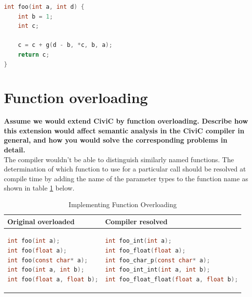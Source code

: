 \documentclass[hidelinks]{uva-inf-article}
\begin{document}
\begin{flushleft}
\begin{lstlisting}[basicstyle=\small, language=C]
int foo(int a, int d) {
	int b = 1;
	int c;

	c = c + g(d - b, *c, b, a);
	return c;
}
\end{lstlisting}
\newpage
\section{Function overloading}
\textbf{Assume we would extend CiviC by function overloading. Describe how 
this extension would affect semantic analysis in the CiviC compiler in general, 
and how you would solve the corresponding problems in detail.\\}
The compiler wouldn't be able to distinguish similarly named functions.
The determination of which function to use for a particular call should 
be resolved at compile time by adding the name of the parameter types to the function name as shown in table \ref{tab:function-overloading} below.
\begin{table}[h!]
  \begin{center}
      \begin{tabular}{l|l} %
          \textbf{Original overloaded} & \textbf{Compiler resolved} \\
          \hline
          \begin{lstlisting}[basicstyle=\small, language=C]
int foo(int a);
int foo(float a);
int foo(const char* a);
int foo(int a, int b);
int foo(float a, float b);
          \end{lstlisting}
            &
          \begin{lstlisting}[basicstyle=\small, language=C]
int foo_int(int a);
int foo_float(float a);
int foo_char_p(const char* a);
int foo_int_int(int a, int b);
int foo_float_float(float a, float b);
          \end{lstlisting}
      \end{tabular}
      \caption{Implementing Function Overloading}
      \label{tab:function-overloading}
  \end{center}
\end{table}
\end{flushleft}
\end{document}
